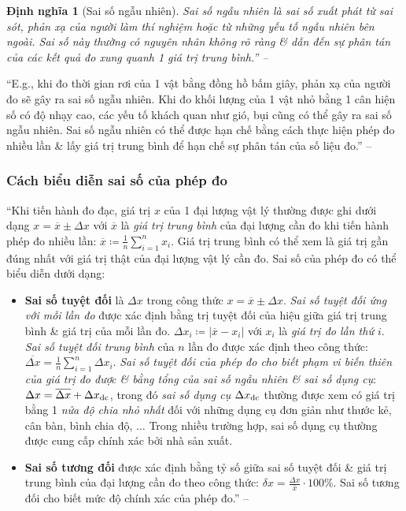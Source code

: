 \documentclass[oneside]{book}
\numberwithin{equation}{section}
\newtheorem{dinhnghia}{Định nghĩa}[section]
\begin{document}
\begin{dinhnghia}[Sai số ngẫu nhiên]
	\emph{Sai số ngẫu nhiên} là sai số xuất phát từ sai sót, phản xạ của người làm thí nghiệm hoặc từ những yếu tố ngẫu nhiên bên ngoài. Sai số này thường có nguyên nhân không rõ ràng \& dẫn đến sự phân tán của các kết quả đo xung quanh 1 giá trị trung bình.'' -- \cite[p. 19]{SGK_Vat_Ly_10_Chan_Troi_Sang_Tao}
\end{dinhnghia}
``E.g., khi đo thời gian rơi của 1 vật bằng đồng hồ bấm giây, phản xạ của người đo sẽ gây ra sai số ngẫu nhiên. Khi đo khối lượng của 1 vật nhỏ bằng 1 cân hiện số có độ nhạy cao, các yếu tố khách quan như gió, bụi cũng có thể gây ra sai số ngẫu nhiên. Sai số ngẫu nhiên có thể được hạn chế bằng cách thực hiện phép đo nhiều lần \& lấy giá trị trung bình để hạn chế sự phân tán của số liệu đo.'' -- \cite[p. 20]{SGK_Vat_Ly_10_Chan_Troi_Sang_Tao}

\subsubsection{Cách biểu diễn sai số của phép đo}
``Khi tiến hành đo đạc, giá trị $x$ của 1 đại lượng vật lý thường được ghi dưới dạng $x = \overline{x}\pm\Delta x$ với $\overline{x}$ là \textit{giá trị trung bình} của đại lượng cần đo khi tiến hành phép đo nhiều lần: $\overline{x}\coloneqq\frac{1}{n}\sum_{i=1}^n x_i$.  Giá trị trung bình có thể xem là giá trị gần đúng nhất với giá trị thật của đại lượng vật lý cần đo. Sai số của phép đo có thể biểu diễn dưới dạng:
\begin{itemize}
	\item \textbf{Sai số tuyệt đối} là $\Delta x$ trong công thức $x = \overline{x}\pm\Delta x$. \textit{Sai số tuyệt đối ứng với mỗi lần đo} được xác định bằng trị tuyệt đối của hiệu giữa giá trị trung bình \& giá trị của mỗi lần đo. $\Delta x_i\coloneqq|\overline{x} - x_i|$ với $x_i$ là \textit{giá trị đo lần thứ $i$}. \textit{Sai số tuyệt đối trung bình} của $n$ lần đo được xác định theo công thức: $\overline{\Delta x} = \frac{1}{n}\sum_{i=1}^n \Delta x_i$. \textit{Sai số tuyệt đối của phép đo cho biết phạm vi biến thiên của giá trị đo được \& bằng tổng của sai số ngẫu nhiên \& sai số dụng cụ}: $\Delta x = \overline{\Delta x} + \Delta x_{\rm dc}$, trong đó \textit{sai số dụng cụ} $\Delta x_{\rm dc}$ thường được xem có giá trị bằng 1 \textit{nửa độ chia nhỏ nhất} đối với những dụng cụ đơn giản như thước kẻ, cân bàn, bình chia độ, $\ldots$ Trong nhiều trường hợp, sai số dụng cụ thường được cung cấp chính xác bởi nhà sản xuất.
	\item \textbf{Sai số tương đối} được xác định bằng tỷ số giữa sai số tuyệt đối \& giá trị trung bình của đại lượng cần đo theo công thức: $\delta x = \frac{\Delta x}{\overline{x}}\cdot 100\%$. Sai số tương đối cho biết mức độ chính xác của phép đo.'' -- \cite[p. 21]{SGK_Vat_Ly_10_Chan_Troi_Sang_Tao}
\end{itemize}
\end{document}
